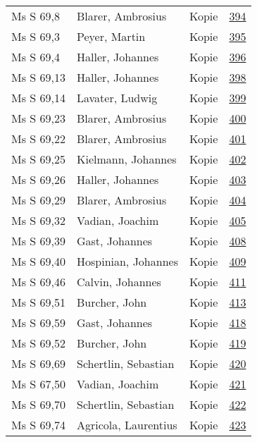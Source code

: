 \documentclass[10pt,a4paper,landscape]{report}
\begin{document}
\begin{longtable}{p{16cm}p{4cm}lr}
Ms S 69,8	&	Blarer, Ambrosius	&	Kopie	&	\href{http://130.60.24.72/assignment/394}{394}\\
Ms S 69,3	&	Peyer, Martin	&	Kopie	&	\href{http://130.60.24.72/assignment/395}{395}\\
Ms S 69,4	&	Haller, Johannes	&	Kopie	&	\href{http://130.60.24.72/assignment/396}{396}\\
Ms S 69,13	&	Haller, Johannes	&	Kopie	&	\href{http://130.60.24.72/assignment/398}{398}\\
Ms S 69,14	&	Lavater, Ludwig	&	Kopie	&	\href{http://130.60.24.72/assignment/399}{399}\\
Ms S 69,23	&	Blarer, Ambrosius	&	Kopie	&	\href{http://130.60.24.72/assignment/400}{400}\\
Ms S 69,22	&	Blarer, Ambrosius	&	Kopie	&	\href{http://130.60.24.72/assignment/401}{401}\\
Ms S 69,25	&	Kielmann, Johannes	&	Kopie	&	\href{http://130.60.24.72/assignment/402}{402}\\
Ms S 69,26	&	Haller, Johannes	&	Kopie	&	\href{http://130.60.24.72/assignment/403}{403}\\
Ms S 69,29	&	Blarer, Ambrosius	&	Kopie	&	\href{http://130.60.24.72/assignment/404}{404}\\
Ms S 69,32	&	Vadian, Joachim	&	Kopie	&	\href{http://130.60.24.72/assignment/405}{405}\\
Ms S 69,39	&	Gast, Johannes	&	Kopie	&	\href{http://130.60.24.72/assignment/408}{408}\\
Ms S 69,40	&	Hospinian, Johannes	&	Kopie	&	\href{http://130.60.24.72/assignment/409}{409}\\
Ms S 69,46	&	Calvin, Johannes	&	Kopie	&	\href{http://130.60.24.72/assignment/411}{411}\\
Ms S 69,51	&	Burcher, John	&	Kopie	&	\href{http://130.60.24.72/assignment/413}{413}\\
Ms S 69,59	&	Gast, Johannes	&	Kopie	&	\href{http://130.60.24.72/assignment/418}{418}\\
Ms S 69,52	&	Burcher, John	&	Kopie	&	\href{http://130.60.24.72/assignment/419}{419}\\
Ms S 69,69	&	Schertlin, Sebastian	&	Kopie	&	\href{http://130.60.24.72/assignment/420}{420}\\
Ms S 67,50	&	Vadian, Joachim	&	Kopie	&	\href{http://130.60.24.72/assignment/421}{421}\\
Ms S 69,70	&	Schertlin, Sebastian	&	Kopie	&	\href{http://130.60.24.72/assignment/422}{422}\\
Ms S 69,74	&	Agricola, Laurentius	&	Kopie	&	\href{http://130.60.24.72/assignment/423}{423}\\

\end{longtable}
\end{document}
